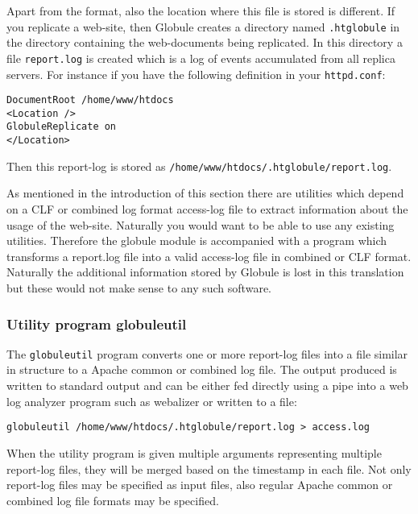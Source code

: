 \documentclass[10pt,a4paper]{article}
\makeatletter
\newenvironment{p}{\@open{P}{}}{\@close{P}}
\newenvironment{p}{}{\par}
\makeatother
\begin{document}
\begin{p}
Apart from the format, also the location where this file is stored is
different.  If you replicate a web-site, then Globule creates a directory
named \verb!.htglobule! in the directory containing the web-documents being
replicated.  In this directory a file \verb!report.log! is created which is a
log of events accumulated from all replica servers.  For instance if you have
the following definition in your \verb!httpd.conf!:
\begin{Verbatim}
DocumentRoot /home/www/htdocs
<Location />
GlobuleReplicate on
</Location>
\end{Verbatim}
Then this report-log is stored as
\verb!/home/www/htdocs/.htglobule/report.log!.
\end{p}

\begin{p}
As mentioned in the introduction of this section there are utilities which
depend on a CLF or combined log format access-log file to extract information
about the usage of the web-site.  Naturally you would want to be able to use
any existing utilities.  Therefore the globule module is accompanied with a
program which transforms a report.log file into a valid access-log file in
combined or CLF format.  Naturally the additional information stored by
Globule is lost in this translation but these would not make sense to any such
software.
\end{p}

\subsubsection{\label{sec:conf:monitoring:globuleutil}
  Utility program globuleutil}

\begin{p}
The \verb!globuleutil! program converts one or more report-log files into a
file similar in structure to a Apache common or combined log file.  The output
produced is written to standard output and can be either fed directly using a
pipe into a web log analyzer program such as webalizer or written to a file:
\end{p}

\begin{Verbatim}
globuleutil /home/www/htdocs/.htglobule/report.log > access.log
\end{Verbatim}

\begin{p}
When the utility program is given multiple arguments representing multiple
report-log files, they will be merged based on the timestamp in each file.
Not only report-log files may be specified as input files, also regular Apache
common or combined log file formats may be specified.
\end{p}
\end{document}
